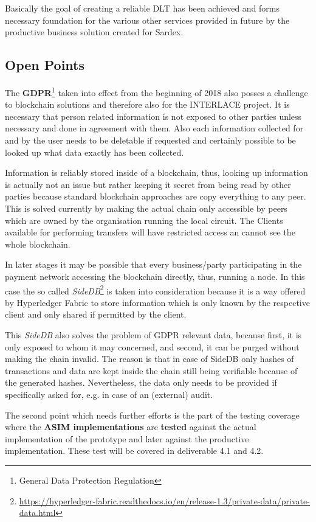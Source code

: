 Basically the goal of creating a reliable DLT has been achieved and forms necessary foundation for the various other services provided in future by the productive business solution created for Sardex.

\subsection{Open Points}

The \textbf{GDPR}\footnote{General Data Protection Regulation\cite{GDPR}} taken into effect from the beginning of 2018 also posses a challenge to blockchain solutions and therefore also for the INTERLACE project. It is necessary that person related information is not exposed to other parties unless necessary and done in agreement with them. Also each information collected for and by the user needs to be deletable if requested and certainly possible to be looked up what data exactly has been collected.

Information is reliably stored inside of a blockchain, thus, looking up information is actually not an issue but rather keeping it secret from being read by other parties because standard blockchain approaches are copy everything to any peer. This is solved currently by making the actual chain only accessible by peers which are owned by the organisation running the local circuit. The Clients available for performing transfers will have restricted access an cannot see the whole blockchain.

In later stages it may be possible that every business/party participating in the payment network accessing the blockchain directly, thus, running a node. In this case the so called \textit{SideDB}\footnote{\url{https://hyperledger-fabric.readthedocs.io/en/release-1.3/private-data/private-data.html}} is taken into consideration because it is a way offered by Hyperledger Fabric to store information which is only known by the respective client and only shared if permitted by the client.

This \textit{SideDB} also solves the problem of GDPR relevant data, because first, it is only exposed to whom it may concerned, and second, it can be purged without making the chain invalid. The reason is that in case of SideDB only hashes of transactions and data are kept inside the chain still being verifiable because of the generated hashes. Nevertheless, the data only needs to be provided if specifically asked for, e.g. in case of an (external) audit.

The second point which needs further efforts is the part of the testing coverage where the \textbf{ASIM implementations} are \textbf{tested} against the actual implementation of the prototype and later against the productive implementation. These test will be covered in deliverable 4.1 and 4.2.